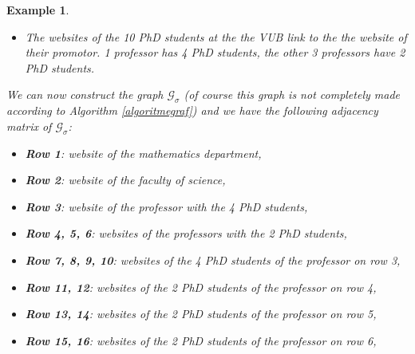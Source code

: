 \documentclass[a4paper,11pt]{report}
\newtheorem{example}[theorem]{Example}
\newcommand{\graf}{\mathscr{G}}
\begin{document}
\begin{example}
\begin{itemize}
    \item The websites of the 10 PhD students at the the VUB link to the the 
    website of their promotor. 1 professor has 4 PhD students, the other 3 professors 
    have 2 PhD students.
      \end{itemize}
We can now construct the graph $\graf_\sigma$ (of course this graph is not completely made according to Algorithm \ref{algoritmegraf}) and we have the following adjacency matrix of 
$\graf_\sigma$:
\setcounter{MaxMatrixCols}{20}
\begin{itemize}
  \item \textbf{Row 1}: website of the mathematics department,
    \item \textbf{Row 2}: website of the faculty of science,
    \item  \textbf{Row 3}: website of the professor with the 4 PhD students,
    \item  \textbf{Row 4, 5, 6}: websites of the professors with the 2 PhD students,
    \item  \textbf{Row 7, 8, 9, 10}: websites of the 4 PhD students of the professor on row 3,
    \item  \textbf{Row 11, 12}: websites of the 2 PhD students of the professor on row 4,
    \item  \textbf{Row 13, 14}: websites of the 2 PhD students of the professor on row 5,
    \item  \textbf{Row 15, 16}: websites of the 2 PhD students of the professor on row 6,



\end{itemize}
\end{example}
\end{document}
